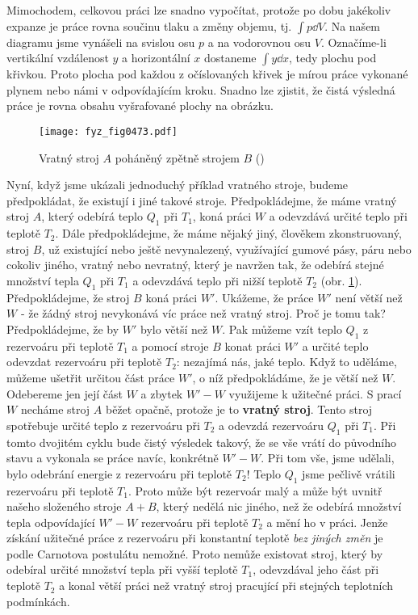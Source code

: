     Mimochodem, celkovou práci lze snadno vypočítat, protože po dobu jakékoliv expanze je práce
    rovna součinu tlaku a změny objemu, tj. \(\int p\dd{V}\). Na našem diagramu jsme vynášeli na
    svislou osu \(p\) a na vodorovnou osu \(V\). Označíme-li vertikální vzdálenost \(y\) a
    horizontální \(x\) dostaneme \(\int y\dd{x}\), tedy plochu pod křivkou. Proto plocha pod každou
    z očíslovaných křivek je mírou práce vykonané plynem nebo námi v odpovídajícím kroku. Snadno lze
    zjistit, že čistá výsledná práce je rovna obsahu vyšrafované plochy na obrázku.

    \begin{figure}[ht!] %
      \centering
      \texttt{[image: fyz\_fig0473.pdf]}
      \caption{Vratný stroj \(A\) poháněný zpětně strojem \(B\) (\cite[s.~707]{Feynman01})}
      \label{fyz:fig0473}
    \end{figure}

    Nyní, když jsme ukázali jednoduchý příklad vratného stroje, budeme předpokládat, že existují i
    jiné takové stroje. Předpokládejme, že máme vratný stroj \(A\), který odebírá teplo \(Q_1\) při
    \(T_1\), koná práci \(W\) a odevzdává určité teplo při teplotě \(T_2\). Dále předpokládejme, že
    máme nějaký jiný, člověkem zkonstruovaný, stroj \(B\), už existující nebo ještě nevynalezený,
    využívající gumové pásy, páru nebo cokoliv jiného, vratný nebo nevratný, který je navržen tak,
    že odebírá stejné množství tepla \(Q_1\) při \(T_1\) a odevzdává teplo při nižší teplotě \(T_2\)
    (obr. \ref{fyz:fig0473}). Předpokládejme, že stroj \(B\) koná práci \(W'\). Ukážeme, že práce \(W
    '\) není větší než \(W\) - že žádný stroj nevykonává víc práce než vratný stroj. Proč je tomu
    tak? Předpokládejme, že by \(W'\) bylo větší než \(W\). Pak můžeme vzít teplo \(Q_1\) z
    rezervoáru při teplotě \(T_1\) a pomocí stroje \(B\) konat práci \(W'\) a určité teplo odevzdat
    rezervoáru při teplotě \(T_2\): nezajímá nás, jaké teplo. Když to uděláme, můžeme ušetřit
    určitou část práce \(W'\), o níž předpokládáme, že je větší než \(W\). Odebereme jen její část
    \(W\) a zbytek \(W'-W\) využijeme k užitečné práci. S prací \(W\) necháme stroj \(A\) běžet
    opačně, protože je to \textbf{vratný stroj}. Tento stroj spotřebuje určité teplo z rezervoáru
    při \(T_2\) a odevzdá rezervoáru \(Q_1\) při \(T_1\). Při tomto dvojitém cyklu bude čistý
    výsledek takový, že se vše vrátí do původního stavu a vykonala se práce navíc, konkrétně \(W
    '-W\). Při tom vše, jsme udělali, bylo odebrání energie z rezervoáru při teplotě \(T_2\)! Teplo
    \(Q_1\) jsme pečlivě vrátili rezervoáru při teplotě \(T_1\). Proto může být rezervoár malý a
    může být uvnitř našeho složeného stroje \(A + B\), který nedělá nic jiného, než že odebírá
    množství tepla odpovídající \(W'-W\) rezervoáru při teplotě \(T_2\) a mění ho v práci. Jenže
    získání užitečné práce z rezervoáru při konstantní teplotě \emph{bez jiných změn} je podle
    Carnotova postulátu nemožné. Proto nemůže existovat stroj, který by odebíral určité množství
    tepla při vyšší teplotě \(T_1\), odevzdával jeho část při teplotě \(T_2\) a konal větší práci
    než vratný stroj pracující při stejných teplotních podmínkách.

